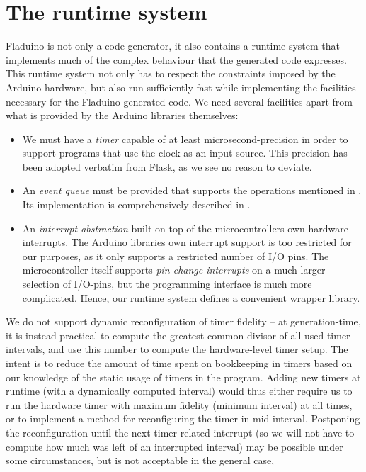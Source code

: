 \documentclass[a4paper, oneside, final]{memoir}
\let\Fref\undefined
\begin{document}
\section{The runtime system}

Fladuino is not only a code-generator, it also contains a runtime
system that implements much of the complex behaviour that the
generated code expresses.  This runtime system not only has to respect
the constraints imposed by the Arduino hardware, but also run
sufficiently fast while implementing the facilities necessary for the
Fladuino-generated code.  We need several facilities apart from what
is provided by the Arduino libraries themselves:

\begin{itemize}
\item We must have a \textit{timer} capable of at least
  microsecond-precision in order to support programs that use the
  clock as an input source.  This precision has been adopted verbatim
  from Flask, as we see no reason to deviate.
\item An \textit{event queue} must be provided that supports the
  operations mentioned in \Fref{sec:dataflowevaluationstrategy}.  Its
  implementation is comprehensively described in
  \Fref{sec:event_queue}.
\item An \textit{interrupt abstraction} built on top of the
  microcontrollers own hardware interrupts.  The Arduino libraries own
  interrupt support is too restricted for our purposes, as it only
  supports a restricted number of I/O pins.  The microcontroller
  itself supports \textit{pin change interrupts} on a much larger
  selection of I/O-pins, but the programming interface is much more
  complicated.  Hence, our runtime system defines a convenient wrapper
  library.
\end{itemize}

We do not support dynamic reconfiguration of timer fidelity -- at
generation-time, it is instead practical to compute the greatest
common divisor of all used timer intervals, and use this number to
compute the hardware-level timer setup.  The intent is to reduce the
amount of time spent on bookkeeping in timers based on our knowledge
of the static usage of timers in the program.  Adding new timers at
runtime (with a dynamically computed interval) would thus either
require us to run the hardware timer with maximum fidelity (minimum
interval) at all times, or to implement a method for reconfiguring the
timer in mid-interval.  Postponing the reconfiguration until the next
timer-related interrupt (so we will not have to compute how much was
left of an interrupted interval) may be possible under some
circumstances, but is not acceptable in the general case, 
\end{document}
